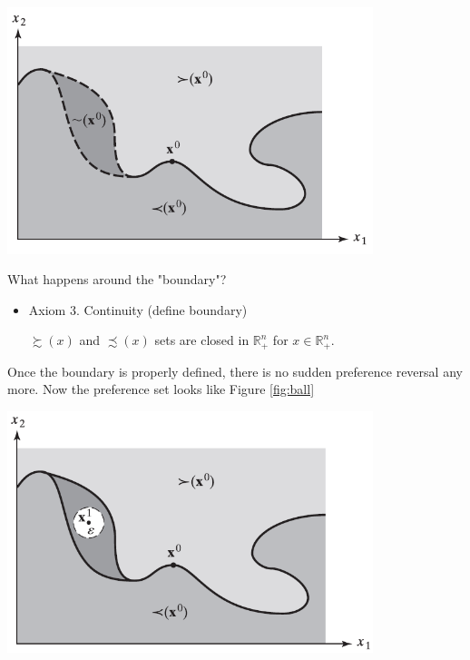\documentclass{article}
\newcommand{\R}{\mathbb{R}}
\begin{document}
\begin{mdframed}[backgroundcolor=blue!20,linecolor=white]
{\centering
\includegraphics[width=0.8\textwidth]{1.open}
\label{open}}
\vspace{2mm}

What happens around the "boundary"?

\begin{itemize}
\item Axiom 3. Continuity (define boundary)

$\succsim (x)$ and $\precsim (x)$ sets are closed in $\R^n_+$ for $x \in \R^n_+ $.
\end{itemize}

Once the boundary is properly defined, there is no sudden preference reversal any more.
Now the preference set looks like Figure \ref{fig:ball}

\vspace{2mm}

{\centering
\includegraphics[width=0.8\textwidth]{1.ball}
\label{fig:ball}}

\vspace{2mm}


\end{mdframed}
\end{document}
